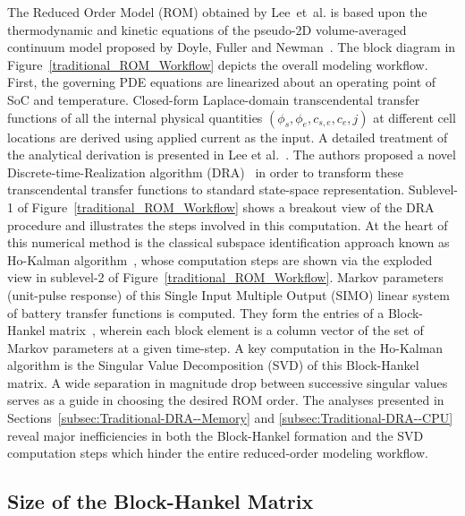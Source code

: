\begin{figure*}
	\caption{}
	\label{traditional_ROM_Workflow}
\end{figure*}
The Reduced Order Model (ROM) obtained by Lee~et~al. is based upon
the thermodynamic and kinetic equations of the pseudo-2D volume-averaged
continuum model proposed by Doyle, Fuller and Newman~\citep{DoyleFullerNewman1993,FullerDoyleNewman1994}.
The block diagram in Figure~\ref{traditional_ROM_Workflow} depicts
the overall modeling workflow. First, the governing PDE equations
are linearized about an operating point of SoC and temperature. Closed-form
Laplace-domain transcendental transfer functions of all the internal
physical quantities $\left(\phi_{s},\phi_{e},c_{s,e},c_{e},j\right)$
at different cell locations are derived using applied current as the
input. A detailed treatment of the analytical derivation is presented
in Lee et al.~\citep{LeeChemistruckPlett2012}. The authors proposed
a novel Discrete-time-Realization algorithm (DRA)~\citep{LeeChemistruckPlett2012a}
in order to transform these transcendental transfer functions to standard
state-space representation. Sublevel-1 of Figure~\ref{traditional_ROM_Workflow}
shows a breakout view of the DRA procedure and illustrates the steps
involved in this computation. At the heart of this numerical method
is the classical subspace identification approach known as Ho-Kalman
algorithm~\citep{KalmanHo1965}, whose computation steps are shown
via the exploded view in sublevel-2 of Figure~\ref{traditional_ROM_Workflow}.
Markov parameters (unit-pulse response) of this Single Input Multiple
Output (SIMO) linear system of battery transfer functions is computed.
They form the entries of a Block-Hankel matrix~\citep{Ljung1998},
wherein each block element is a column vector of the set of Markov
parameters at a given time-step. A key computation in the Ho-Kalman
algorithm is the Singular Value Decomposition (SVD) of this Block-Hankel
matrix. A wide separation in magnitude drop between successive singular
values serves as a guide in choosing the desired ROM order. The analyses
presented in Sections~\ref{subsec:Traditional-DRA--Memory} and \ref{subsec:Traditional-DRA--CPU}
reveal major inefficiencies in both the Block-Hankel formation and
the SVD computation steps which hinder the entire reduced-order modeling
workflow.

\subsection{Size of the Block-Hankel Matrix\label{subsec:Size-of-the}}

